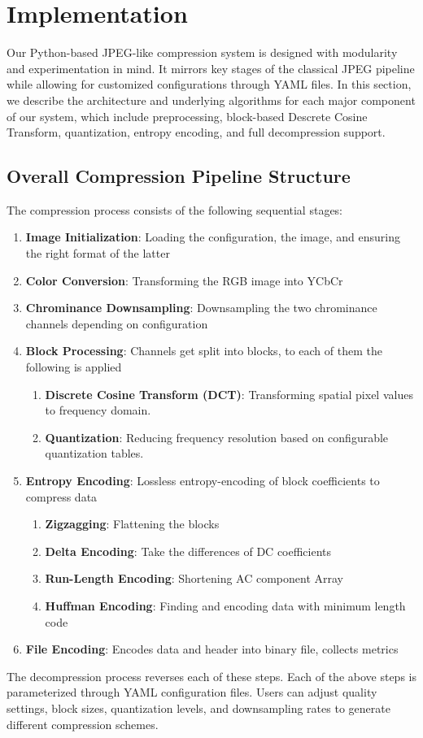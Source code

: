 \section{Implementation}
\label{sec:implementation}

Our Python-based JPEG-like compression system is designed with modularity and experimentation in mind. It mirrors key stages of the classical JPEG pipeline while allowing for customized configurations through YAML files. In this section, we describe the architecture and underlying algorithms for each major component of our system, which include preprocessing, block-based Descrete Cosine Transform, quantization, entropy encoding, and full decompression support.

\subsection{Overall Compression Pipeline Structure}
The compression process consists of the following sequential stages:
\begin{enumerate}
    \item \textbf{Image Initialization}: Loading the configuration, the image, and ensuring the right format of the latter
    \item \textbf{Color Conversion}: Transforming the RGB image into YCbCr
    \item \textbf{Chrominance Downsampling}: Downsampling the two chrominance channels depending on configuration
    \item \textbf{Block Processing}: Channels get split into blocks, to each of them the following is applied
    \begin{enumerate}
    	\item \textbf{Discrete Cosine Transform (DCT)}: Transforming spatial pixel values to frequency domain.
		\item \textbf{Quantization}: Reducing frequency resolution based on configurable quantization tables.
    \end{enumerate}
    \item \textbf{Entropy Encoding}: Lossless entropy-encoding of block coefficients to compress data
        \begin{enumerate}
    	\item \textbf{Zigzagging}: Flattening the blocks
    	\item \textbf{Delta Encoding}: Take the differences of DC coefficients
    	\item \textbf{Run-Length Encoding}: Shortening AC component Array 
    	\item \textbf{Huffman Encoding}: Finding and encoding data with minimum length code 
    \end{enumerate}
    \item \textbf{File Encoding}: Encodes data and header into binary file, collects metrics
\end{enumerate}
\noindent
The decompression process reverses each of these steps.
\noindent
Each of the above steps is parameterized through YAML configuration files. Users can adjust quality settings, block sizes, quantization levels, and downsampling rates to generate different compression schemes.

